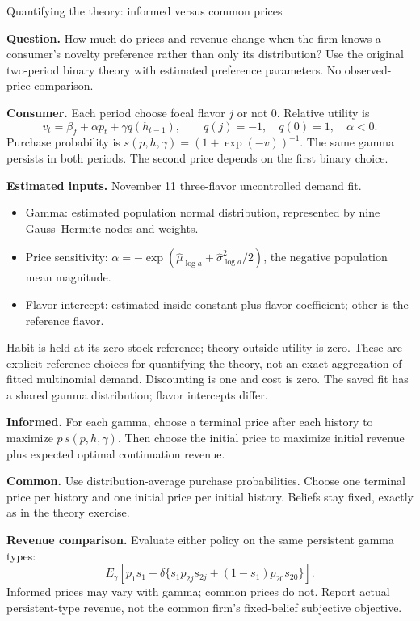 \documentclass[11pt]{article}
\begin{document}
\begin{center}\Large Quantifying the theory: informed versus common prices\end{center}
\textbf{Question.} How much do prices and revenue change when the firm knows a consumer's novelty preference rather than only its distribution? Use the original two-period binary theory with estimated preference parameters. No observed-price comparison.

\textbf{Consumer.} Each period choose focal flavor $j$ or not $0$. Relative utility is
\[
v_t=\beta_f+\alpha p_t+\gamma q(h_{t-1}),\qquad q(j)=-1,\quad q(0)=1,\quad\alpha<0.
\]
Purchase probability is $s(p,h,\gamma)=(1+\exp(-v))^{-1}$. The same gamma persists in both periods. The second price depends on the first binary choice.

\textbf{Estimated inputs.} November 11 three-flavor uncontrolled demand fit.
\begin{itemize}
\item Gamma: estimated population normal distribution, represented by nine Gauss--Hermite nodes and weights.
\item Price sensitivity: $\alpha=-\exp(\widehat\mu_{\log a}+\widehat\sigma_{\log a}^{2}/2)$, the negative population mean magnitude.
\item Flavor intercept: estimated inside constant plus flavor coefficient; other is the reference flavor.
\end{itemize}
Habit is held at its zero-stock reference; theory outside utility is zero. These are explicit reference choices for quantifying the theory, not an exact aggregation of fitted multinomial demand. Discounting is one and cost is zero. The saved fit has a shared gamma distribution; flavor intercepts differ.

\textbf{Informed.} For each gamma, choose a terminal price after each history to maximize $p\,s(p,h,\gamma)$. Then choose the initial price to maximize initial revenue plus expected optimal continuation revenue.

\textbf{Common.} Use distribution-average purchase probabilities. Choose one terminal price per history and one initial price per initial history. Beliefs stay fixed, exactly as in the theory exercise.

\textbf{Revenue comparison.} Evaluate either policy on the same persistent gamma types:
\[
E_\gamma\left[p_1s_1+\delta\{s_1p_{2j}s_{2j}+(1-s_1)p_{20}s_{20}\}\right].
\]
Informed prices may vary with gamma; common prices do not. Report actual persistent-type revenue, not the common firm's fixed-belief subjective objective.
\end{document}
